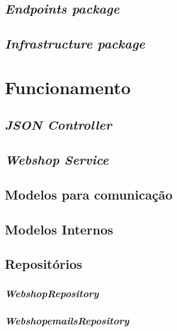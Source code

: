 \newpage

\subsection{\textit{\textit{Endpoints} package}}\label{endp}

\subsection{\textit{\textit{Infrastructure} package}}\label{infra}

\section{Funcionamento}

\subsection{\textit{JSON Controller}}

\subsection{\textit{Webshop Service}}

\subsection{Modelos para comunicação}

\subsection{Modelos Internos}

\subsection{Repositórios}

\subsubsection{\textit{WebshopRepository}}

\subsubsection{\textit{WebshopemailsRepository}}
